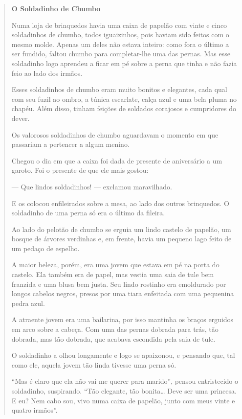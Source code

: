 \begin{quote}
\textbf{O Soldadinho de Chumbo}




Numa loja de brinquedos havia uma caixa de papelão com vinte e cinco
soldadinhos de chumbo, todos iguaizinhos, pois haviam sido feitos com o
mesmo molde. Apenas um deles não estava inteiro: como fora o último a ser
fundido, faltou chumbo para completar-lhe uma das pernas. Mas esse soldadinho
logo aprendeu a ficar em pé sobre a perna que tinha e não fazia feio
ao lado dos irmãos.

Esses soldadinhos de chumbo eram muito bonitos e elegantes, cada qual
com seu fuzil ao ombro, a túnica escarlate, calça azul e uma bela pluma
no chapéu. Além disso, tinham feições de soldados corajosos e
cumpridores do dever.

Os valorosos soldadinhos de chumbo aguardavam o momento em que passariam
a pertencer a algum menino.

Chegou o dia em que a caixa foi dada de presente de aniversário a um
garoto. Foi o presente de que ele mais gostou:

--- Que lindos soldadinhos! --- exclamou maravilhado.

E os colocou enfileirados sobre a mesa, ao lado dos outros brinquedos. O
soldadinho de uma perna só era o último da fileira.

Ao lado do pelotão de chumbo se erguia um lindo castelo de papelão, um
bosque de árvores verdinhas e, em frente, havia um pequeno lago feito de
um pedaço de espelho.

A maior beleza, porém, era uma jovem que estava em pé na porta do
castelo. Ela também era de papel, mas vestia uma saia de tule bem
franzida e uma blusa bem justa. Seu lindo rostinho era emoldurado por
longos cabelos negros, presos por uma tiara enfeitada com uma pequenina
pedra azul.

A atraente jovem era uma bailarina, por isso mantinha os braços erguidos
em arco sobre a cabeça. Com uma das pernas dobrada para trás, tão
dobrada, mas tão dobrada, que acabava escondida pela saia de tule.

O soldadinho a olhou longamente e logo se apaixonou, e pensando que, tal
como ele, aquela jovem tão linda tivesse uma perna só.

``Mas é claro que ela não vai me querer para marido'', pensou
entristecido o soldadinho, suspirando. ``Tão elegante, tão
bonita\ldots{} Deve ser uma princesa. E eu? Nem cabo sou, vivo numa
caixa de papelão, junto com meus vinte e quatro
irmãos''.


\end{quote}
